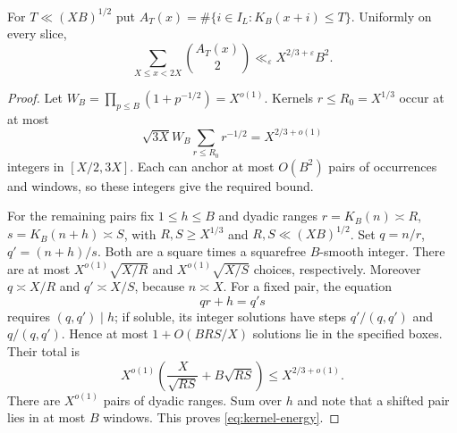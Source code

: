 \begin{lemma}\label{lem:kernel-energy}
For $T\ll(XB)^{1/2}$ put
$A_T(x)=\#\{i\in I_L:K_B(x+i)\le T\}$. Uniformly on every slice,
\begin{equation}\label{eq:kernel-energy}
 \sum_{X\le x<2X}\binom{A_T(x)}2\ll_\varepsilon X^{2/3+\varepsilon}B^2.
\end{equation}
\end{lemma}
\begin{proof}
Let $W_B=\prod_{p\le B}(1+p^{-1/2})=X^{o(1)}$.
Kernels $r\le R_0=X^{1/3}$ occur at at most
\[
 \sqrt{3X}W_B\sum_{r\le R_0}r^{-1/2}=X^{2/3+o(1)}
\]
integers in $[X/2,3X]$. Each can anchor at most $O(B^2)$ pairs of
occurrences and windows, so these integers give the required bound.

For the remaining pairs fix $1\le h\le B$ and dyadic ranges
$r=K_B(n)\asymp R$, $s=K_B(n+h)\asymp S$, with
$R,S\ge X^{1/3}$ and $R,S\ll(XB)^{1/2}$.
Set $q=n/r$, $q'=(n+h)/s$. Both are a square times a squarefree
$B$-smooth integer. There are at most
$X^{o(1)}\sqrt{X/R}$ and $X^{o(1)}\sqrt{X/S}$ choices, respectively.
Moreover $q\asymp X/R$ and $q'\asymp X/S$, because $n\asymp X$.
For a fixed pair, the equation
\[
 qr+h=q's
\]
requires $(q,q')\mid h$; if soluble, its integer solutions have steps
$q'/(q,q')$ and $q/(q,q')$. Hence at most $1+O(BRS/X)$ solutions lie
in the specified boxes. Their total is
\[
 X^{o(1)}\left(\frac{X}{\sqrt{RS}}+B\sqrt{RS}\right)
 \le X^{2/3+o(1)}.
\]
There are $X^{o(1)}$ pairs of dyadic ranges. Sum over $h$ and note
that a shifted pair lies in at most $B$ windows. This proves
\eqref{eq:kernel-energy}.
\end{proof}

